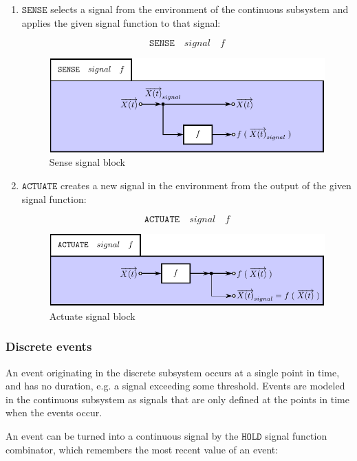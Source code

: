 \documentclass[a4paper]{article}
\begin{document}
\begin{enumerate}
\item $\texttt{SENSE}$ selects a signal from the environment of the
  continuous subsystem and applies the given signal function to that
  signal: 

\[\texttt{SENSE}\quad{}signal\quad{}f\]

\begin{figure}
\includegraphics{figures/SenseSignalBlock}
\caption{\label{Fig:SenseSignalBlock}Sense signal block}
\end{figure}

\item $\texttt{ACTUATE}$ creates a new signal in the environment from
  the output of the given signal function:

\[\texttt{ACTUATE}\quad{}signal\quad{}f\]

\begin{figure}
\includegraphics{figures/ActuateSignalBlock}
\caption{\label{Fig:ActuateSignalBlock}Actuate signal block}
\end{figure}

\end{enumerate}

\subsubsection{Discrete events}

An event originating in the discrete subsystem occurs at a single
point in time, and has no duration, e.g. a signal exceeding some
threshold. Events are modeled in the continuous subsystem as signals
that are only defined at the points in time when the events occur.

An event can be turned into a continuous signal by the $\texttt{HOLD}$
signal function combinator, which remembers the most recent value of
an event:
\end{document}
